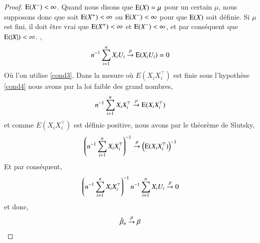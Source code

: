 \documentclass[10pt, reqno]{amsart}
\begin{document}
\begin{proof}
{$\operatorname{E}(X^{-}) <\infty$. Quand nous disons que $\operatorname{E}(X) = \mu$ pour un certain $\mu$, nous supposons donc que  soit
$\operatorname{E}(X^{+}) <\infty$ ou $\operatorname{E}(X^{-}) <\infty$ pour que $\operatorname{E}(X)$ soit définie.
Si $\mu$ est fini, il doit être vrai que $\operatorname{E}(X^{+}) < \infty$ et $\operatorname{E}(X^{-}) <\infty$, et
par conséquent que $\operatorname{E}(\left\vert {X} \right\vert) < \infty$.
},
\begin{align*}
n^{-1} \sum_{i=1}^n X_iU_i \overset{p}{\rightarrow} \operatorname{E}(X_iU_i) = 0
\end{align*}
Où l'on utilise \ref{cond3}. Dans la mesure où $E(X_iX_i^\top)$ est finie sous l'hypothèse \ref{cond4} nous avons par la loi faible des grand nombres,
\begin{align*}
n^{-1} \sum_{i=1}^n X_iX_i^\top \overset{p}{\rightarrow} \operatorname{E}(X_iX_i^\top)
\end{align*}
et comme  $E(X_iX_i^\top)$ est définie positive, nous avons  par le théorème de Slutsky,
\begin{align}
\left(n^{-1} \sum_{i=1}^n X_iX_i^\top\right)^{-1} \overset{p}{\rightarrow} \left(\operatorname{E}(X_iX_i^\top)\right)^{-1}
\label{eq2}
\end{align}
Et par conséquent,
\begin{align*}
\left(n^{-1}\sum_{i=1}^n X_iX_i^\top\right)^{-1}n^{-1}\sum_{i=1}^n X_iU_i \overset{p}{\rightarrow} 0
\end{align*}
et donc,
\begin{align*}
\hat{\beta}_n\overset{p}{\rightarrow} \beta
\end{align*}
\end{proof}
\end{document}
